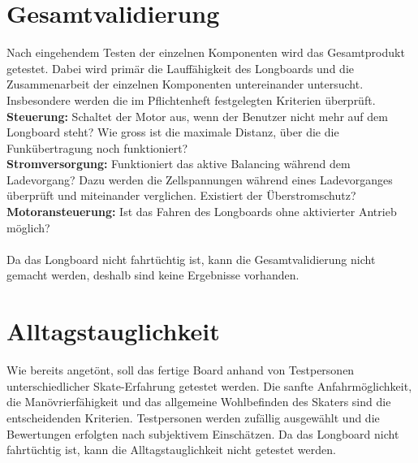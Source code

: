\section{Gesamtvalidierung}
\label{ValidGesamtv}
Nach eingehendem Testen der einzelnen Komponenten wird das Gesamtprodukt getestet. Dabei wird primär die Lauffähigkeit des Longboards und die Zusammenarbeit der einzelnen Komponenten untereinander untersucht. Insbesondere werden die im Pflichtenheft festgelegten Kriterien überprüft. \\
\textbf{Steuerung:} Schaltet der Motor aus, wenn der Benutzer nicht mehr auf dem Longboard steht? Wie gross ist die maximale Distanz, über die die Funkübertragung noch funktioniert? \\
\textbf{Stromversorgung:} Funktioniert das aktive Balancing während dem Ladevorgang? Dazu werden die Zellspannungen während eines Ladevorganges überprüft und miteinander verglichen. Existiert der Überstromschutz?\\ 
\textbf{Motoransteuerung:} Ist das Fahren des Longboards ohne aktivierter Antrieb möglich? \\
\\
Da das Longboard nicht fahrtüchtig ist, kann die Gesamtvalidierung nicht gemacht werden, deshalb sind keine Ergebnisse vorhanden.

\section{Alltagstauglichkeit}
\label{ValidAlltag}
Wie bereits angetönt, soll das fertige Board anhand von Testpersonen unterschiedlicher Skate-Erfahrung getestet werden. Die sanfte Anfahrmöglichkeit, die Manövrierfähigkeit und das allgemeine Wohlbefinden des Skaters sind die entscheidenden Kriterien. 
Testpersonen werden zufällig ausgewählt und die Bewertungen erfolgten nach subjektivem Einschätzen. 
Da das Longboard nicht fahrtüchtig ist, kann die Alltagstauglichkeit nicht getestet werden.

